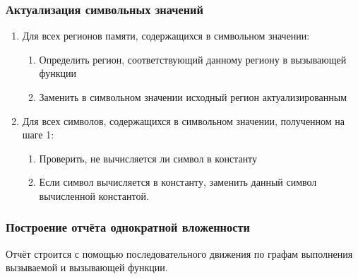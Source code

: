 \documentclass[hyperref={pdfpagelabels=false},10pt]{beamer}
\begin{document}

\begin{frame}
\frametitle{Актуализация символьных значений}

\begin{enumerate}
 \item Для всех регионов памяти, содержащихся в символьном значении:
 \begin{enumerate}
  \item Определить регион, соответствующий данному региону в вызывающей функции
  \item Заменить в символьном значении исходный регион актуализированным
 \end{enumerate}
 \item Для всех символов, содержащихся в символьном значении, полученном на шаге 1:
  \begin{enumerate}
  \item Проверить, не вычисляется ли символ в константу
  \item Если символ вычисляется в константу, заменить данный символ вычисленной константой.
 \end{enumerate}

\end{enumerate}
\end{frame}


\begin{frame}
\frametitle{Построение отчёта однократной вложенности}
Отчёт строится с помощью последовательного движения по графам выполнения вызываемой и вызывающей функции.

\begin{figure}[H]
\end{figure}
\end{frame}
\end{document}
